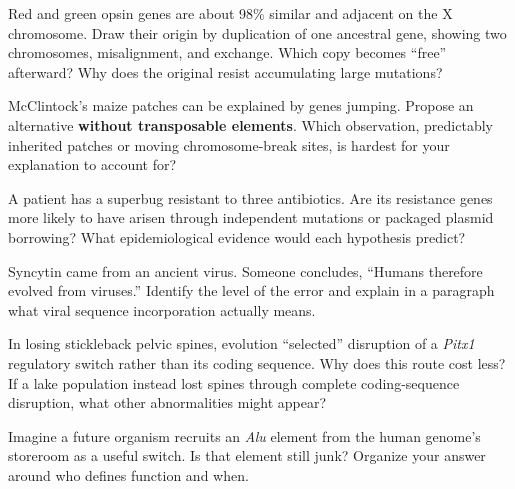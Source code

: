 \begin{sikaoti}
\item Red and green opsin genes are about 98\% similar and adjacent on the X chromosome. Draw their origin by duplication of one ancestral gene, showing two chromosomes, misalignment, and exchange. Which copy becomes ``free'' afterward? Why does the original resist accumulating large mutations?
\item McClintock's maize patches can be explained by genes jumping. Propose an alternative \textbf{without transposable elements}. Which observation, predictably inherited patches or moving chromosome-break sites, is hardest for your explanation to account for?
\item A patient has a superbug resistant to three antibiotics. Are its resistance genes more likely to have arisen through independent mutations or packaged plasmid borrowing? What epidemiological evidence would each hypothesis predict?
\item Syncytin came from an ancient virus. Someone concludes, ``Humans therefore evolved from viruses.'' Identify the level of the error and explain in a paragraph what viral sequence incorporation actually means.
\item In losing stickleback pelvic spines, evolution ``selected'' disruption of a \emph{Pitx1} regulatory switch rather than its coding sequence. Why does this route cost less? If a lake population instead lost spines through complete coding-sequence disruption, what other abnormalities might appear?
\item Imagine a future organism recruits an \emph{Alu} element from the human genome's storeroom as a useful switch. Is that element still junk? Organize your answer around who defines function and when.
\end{sikaoti}
